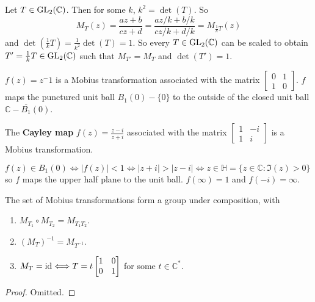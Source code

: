 \begin{remark}\label{rem:mobiusTransformationDet1}
	Let $T \in \text{GL}_2(\mathbb{C})$. Then for some $k$, $k^2 = \det(T)$. So
	\[
		M_T(z) = \frac{az + b}{cz + d} = \frac{az/k + b/k}{cz/k + d/k} = M_{\frac{1}{k} T} (z)
	\]
	and $\det(\frac{1}{k} T) = \frac{1}{k^2} \det(T) = 1$. So every $T \in \text{GL}_2(\mathbb{C})$ can be scaled to obtain $T' = \frac{1}{k} T \in \text{GL}_2(\mathbb{C})$ such that $M_{T'} = M_T$ and $\det(T') = 1$.
\end{remark}

\begin{example}
	$f(z) = z^-1$ is a Mobius transformation associated with the matrix $\begin{bmatrix} 0 & 1 \\ 1 & 0 \end{bmatrix}$. $f$ maps the punctured unit ball $B_1(0) - \{ 0 \}$ to the outside of the closed unit ball $\mathbb{C} - \overline{B_1}(0)$.
\end{example}

\begin{example}
	The \textbf{Cayley map} $f(z) = \frac{z - i}{z + i}$ associated with the matrix $\begin{bmatrix} 1 & -i \\ 1 & i \end{bmatrix}$ is a Mobius transformation.

	$f(z) \in B_1(0) \Longleftrightarrow |f(z)| < 1 \Longleftrightarrow |z + i| > |z - i| \Longleftrightarrow z \in \mathbb{H} = \{ z \in \mathbb{C}: \Im(z) > 0 \}$ so $f$ maps the upper half plane to the unit ball. $f(\infty) = 1$ and $f(-i) = \infty$.
\end{example}

\begin{lemma}
	The set of Mobius transformations form a group under composition, with
	\begin{enumerate}
		\item $M_{T_1} \circ M_{T_2} = M_{T_1 T_2}$.
		\item ${(M_T)}^{-1} = M_{T^{-1}}$.
		\item $M_T = \text{id} \Longleftrightarrow T = t \begin{bmatrix} 1 & 0 \\ 0 & 1 \end{bmatrix}$ for some $t \in \mathbb{C}^*$.
	\end{enumerate}
\end{lemma}

\begin{proof}
	Omitted.
\end{proof}

